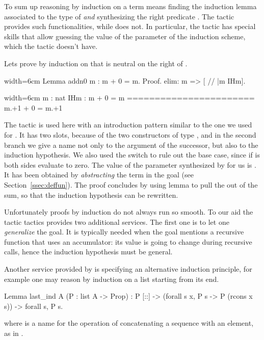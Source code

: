 To sum up reasoning by induction on a term  means
finding the induction lemma associated to the type of 
\emph{and} synthesizing
the right predicate .  The  tactic provides such
functionalities, while  does not. In particular, the
 tactic has special skills that allow guessing the value of
the parameter  of the induction scheme, which the 
tactic doesn't have.

Lets prove by induction on  that  is neutral on the
right of .

\begin{coq}{}{width=6cm}
Lemma addn0 m : m + 0 = m.
Proof.
elim: m => [ // |m IHm].
\end{coq}
\begin{coqout}{}{width=6cm}
m : nat
IHm : m + 0 = m
=======================
m.+1 + 0 = m.+1
\end{coqout}
The  tactic is used here with an introduction pattern similar
to the one we used for . It has two slots, because of the
two constructors of type , and in the second branch we give a
name not only to the argument  of the successor, but also to the
induction hypothesis. We also used the \C{//} switch to rule out the
base case, since if
 is  both sides evaluate to zero. The value of the parameter
 synthesized by  for us is
. It has been obtained by
\emph{abstracting} the term  in the goal (see
Section~\ref{ssec:deffun}). The proof concludes by using lemma 
to  pull the  out of the sum, so that the induction hypothesis
 can be rewritten.

Unfortunately proofs by induction do not always run so smooth.
To our aid the  tactic tactics provides two additional services.
The first one is to let one \emph{generalize}
the goal.  It is typically needed when the goal mentions a recursive function
that uses an accumulator: its value is going to change during recursive calls,
hence the induction hypothesis must be general.

Another service provided by  is specifying an alternative
induction principle, for example one may reason by induction on
a list starting from its end.

\begin{coq}{}{}
Lemma last_ind A (P : list A -> Prop) :
  P [::] -> (forall s x, P s -> P (rcons x s)) -> forall s, P s.
\end{coq}
where  is a name for the operation of concatenating
a sequence with an element, as in .

